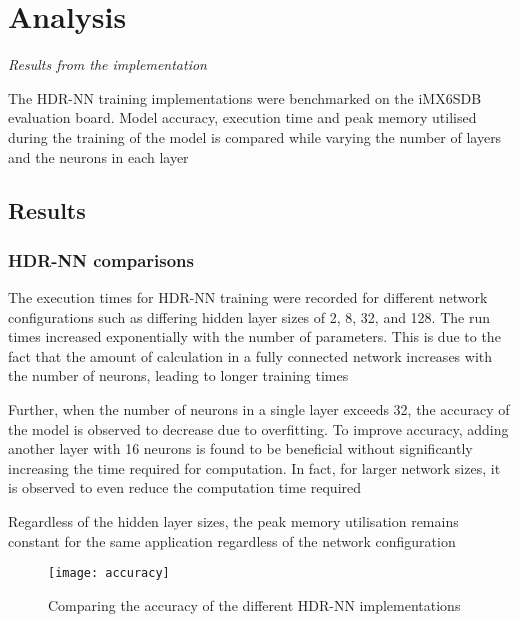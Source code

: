 \part{Analysis}
\textit{Results from the implementation}


The HDR-NN training implementations were benchmarked on the iMX6SDB evaluation board. Model accuracy, execution time and peak memory utilised during the training of the model is compared while varying the number of layers and the neurons in each layer

\chapter{Results}

\section{HDR-NN comparisons}

The execution times for HDR-NN training were recorded for different network configurations such as differing hidden layer sizes of 2, 8, 32, and 128. The run times increased exponentially with the number of parameters. This is due to the fact that the amount of calculation in a fully connected network increases with the number of neurons, leading to longer training times

Further, when the number of neurons in a single layer exceeds 32, the accuracy of the model is observed to decrease due to overfitting. To improve accuracy, adding another layer with 16 neurons is found to be beneficial without significantly increasing the time required for computation. In fact, for larger network sizes, it is observed to even reduce the computation time required

Regardless of the hidden layer sizes, the peak memory utilisation remains constant for the same application regardless of the network configuration

\begin{figure}[ht]
	\centering
	\texttt{[image: accuracy]}
	\caption[HDR-NN Accuracy]{Comparing the accuracy of the different HDR-NN implementations}
\end{figure}


